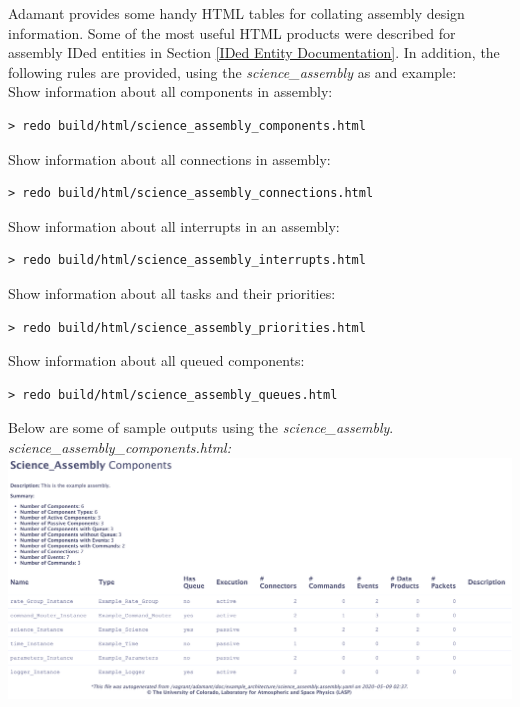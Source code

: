 Adamant provides some handy HTML tables for collating assembly design information. Some of the most useful HTML products were described for assembly IDed entities in Section \ref{IDed Entity Documentation}. In addition, the following rules are provided, using the \textit{science\_assembly} as and example: \\

Show information about all components in assembly: \\
\begin{verbatim}
> redo build/html/science_assembly_components.html
\end{verbatim}
\vspace{7mm} %

Show information about all connections in assembly: \\
\begin{verbatim}
> redo build/html/science_assembly_connections.html
\end{verbatim}
\vspace{7mm} %

Show information about all interrupts in an assembly: \\
\begin{verbatim}
> redo build/html/science_assembly_interrupts.html
\end{verbatim}
\vspace{7mm} %

Show information about all tasks and their priorities: \\
\begin{verbatim}
> redo build/html/science_assembly_priorities.html
\end{verbatim}
\vspace{7mm} %

Show information about all queued components: \\
\begin{verbatim}
> redo build/html/science_assembly_queues.html
\end{verbatim}
\vspace{7mm} %

Below are some of sample outputs using the \textit{science\_assembly}. \\

\textit{science\_assembly\_components.html:} \\

\includegraphics[width=\textwidth]{images/assemblycomponentshtml.png}
\vspace{7mm} %

